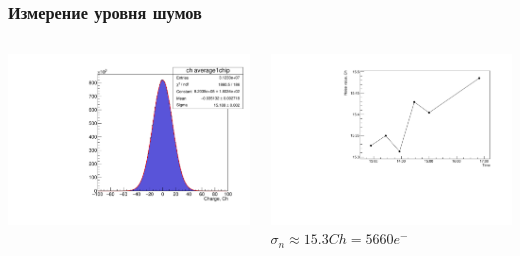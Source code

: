 \documentclass[14pt]{beamer}
\begin{document}
\begin{frame}[c]
\frametitle{Измерение уровня шумов}
\vspace{10pt}
\begin{columns}
	\begin{minipage}[t][1\textheight]{\linewidth}
		\vspace*{38pt}
		\includegraphics[width=1\linewidth]{Noise_stat.pdf}
	\end{minipage}%
	\begin{minipage}[t][1\textheight]{\linewidth}
	\vspace*{30pt}
	\includegraphics[width=1\linewidth]{Noise_time_drift.pdf}
	\\ \centering \small{$\sigma_{n} \approx 15.3 Ch = 5660 e^{-}$}
	\end{minipage}
\end{columns}
\end{frame}
\end{document}
